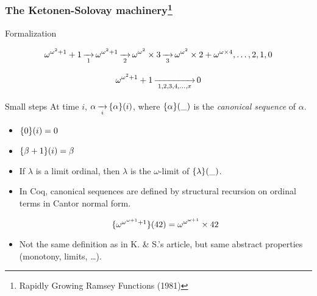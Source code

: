 \documentclass[10pt, fleqn]{beamer}
\begin{document}

\begin{frame}
  \frametitle{The Ketonen-Solovay machinery\footnote{Rapidly Growing {R}amsey Functions (1981)}}
    \begin{block}{Formalization}

      $$\omega^{\omega^2+1}+1 \rplus{1} \omega^{\omega^2+1}
      \rplus{2} \omega^{\omega^2}\times 3 
      \rplus{3} \omega^{\omega^2}\times 2 +
      \omega ^ {\omega \times 4}, \dots,2,1,0$$

      \vspace{6pt}
      
      $$ \omega^{\omega^2+1}+1 \rplus{1,2,3,4,\dots,x} 0$$
    \end{block}
    
      \begin{block}{Small steps}
        At time $i$, 
           $\alpha \rplus{i} \canonseq{\alpha}{i}$,
        where $\mbox{$\{\alpha\}(\_)$}$ is the \emph{canonical sequence} of $\alpha$.
        \begin{itemize}
        \item $\mbox{$\{0\}(i)$}=0$
        \item $\mbox{$\{\beta+1\}(i)$}=\beta$
         \item If $\lambda$ is a limit ordinal, then $\lambda$ is the $\omega$-limit of $\mbox{$\{\lambda\}(\_)$}$.
        \end{itemize}
    \end{block}
  
    
    
 
   
 
  \end{frame}

\begin{frame}
   
     \begin{block}{}
       \begin{itemize}
       \item In Coq, canonical sequences are defined by structural recursion on ordinal terms in Cantor normal form.
         
   {\color{mathcolor}
         $$\mbox{$\{\omega^{\omega^{\omega+1}+1}\}(42)$}=
         \omega^{\omega^{\omega+1}}\times 42$$
         }
         
         
       \item Not the same definition as in K. \& S.'s article, but same abstract properties (monotony, limits, \dots).
       \end{itemize}
     \end{block}
\end{frame}
\end{document}
